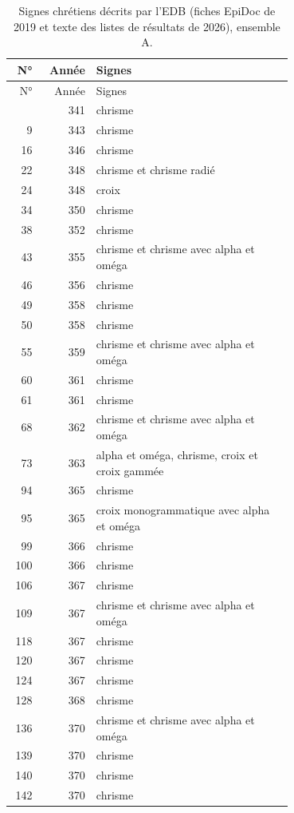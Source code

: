 \begin{longtable}{@{}r r p{0.7\linewidth}@{}}\caption{Signes chrétiens décrits par l’EDB (fiches EpiDoc de 2019 et texte des listes de résultats de 2026), ensemble A.}\label{tab:signes}\\\toprule N° & Année & Signes\\\midrule\endfirsthead\toprule N° & Année & Signes\\\midrule\endhead\bottomrule\endfoot
4 & 341 & chrisme \\
9 & 343 & chrisme \\
16 & 346 & chrisme \\
22 & 348 & chrisme et chrisme radié \\
24 & 348 & croix \\
34 & 350 & chrisme \\
38 & 352 & chrisme \\
43 & 355 & chrisme et chrisme avec alpha et oméga \\
46 & 356 & chrisme \\
49 & 358 & chrisme \\
50 & 358 & chrisme \\
55 & 359 & chrisme et chrisme avec alpha et oméga \\
60 & 361 & chrisme \\
61 & 361 & chrisme \\
68 & 362 & chrisme et chrisme avec alpha et oméga \\
73 & 363 & alpha et oméga, chrisme, croix et croix gammée \\
94 & 365 & chrisme \\
95 & 365 & croix monogrammatique avec alpha et oméga \\
99 & 366 & chrisme \\
100 & 366 & chrisme \\
106 & 367 & chrisme \\
109 & 367 & chrisme et chrisme avec alpha et oméga \\
118 & 367 & chrisme \\
120 & 367 & chrisme \\
124 & 367 & chrisme \\
128 & 368 & chrisme \\
136 & 370 & chrisme et chrisme avec alpha et oméga \\
139 & 370 & chrisme \\
140 & 370 & chrisme \\
142 & 370 & chrisme \\

\end{longtable}
